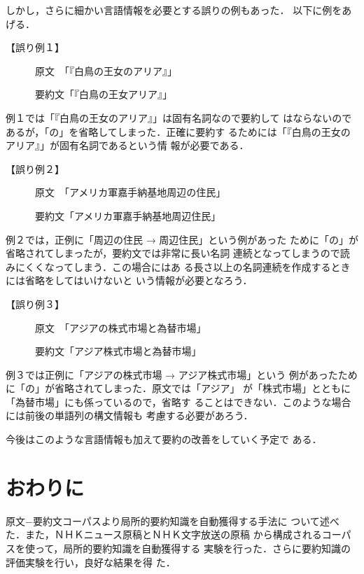 しかし，さらに細かい言語情報を必要とする誤りの例もあった．
以下に例をあげる．
\newpage
\begin{flushleft}
【誤り例１】

　　　原文　「『白鳥の王女のアリア』」

　　　要約文「『白鳥の王女アリア』」
\end{flushleft}

\begin{flushleft}
例１では「『白鳥の王女のアリア』」は固有名詞なので要約して
はならないのであるが，「の」を省略してしまった．正確に要約す
るためには「『白鳥の王女のアリア』」が固有名詞であるという情
報が必要である．
\end{flushleft}

\begin{flushleft}
【誤り例２】

　　　原文　「アメリカ軍嘉手納基地周辺の住民」

　　　要約文「アメリカ軍嘉手納基地周辺住民」 \\
\end{flushleft}

\begin{flushleft}
例２では，正例に「周辺の住民 → 周辺住民」という例があった
ために「の」が省略されてしまったが，要約文では非常に長い名詞
連続となってしまうので読みにくくなってしまう．この場合にはあ
る長さ以上の名詞連続を作成するときには省略をしてはいけないと
いう情報が必要となろう．
\end{flushleft}

\begin{flushleft}
【誤り例３】

　　　原文　「アジアの株式市場と為替市場」

　　　要約文「アジア株式市場と為替市場」 \\
\end{flushleft}

\begin{flushleft}
例３では正例に「アジアの株式市場 → アジア株式市場」という
例があったために「の」が省略されてしまった．原文では「アジア」
が「株式市場」とともに「為替市場」にも係っているので，省略す
ることはできない．このような場合には前後の単語列の構文情報も
考慮する必要があろう．
\end{flushleft}

今後はこのような言語情報も加えて要約の改善をしていく予定で
ある．

\section{おわりに}
\label{sec:sec6}
原文−要約文コーパスより局所的要約知識を自動獲得する手法に
ついて述べた．また，ＮＨＫニュース原稿とＮＨＫ文字放送の原稿
から構成されるコーパスを使って，局所的要約知識を自動獲得する
実験を行った．さらに要約知識の評価実験を行い，良好な結果を得
た．

